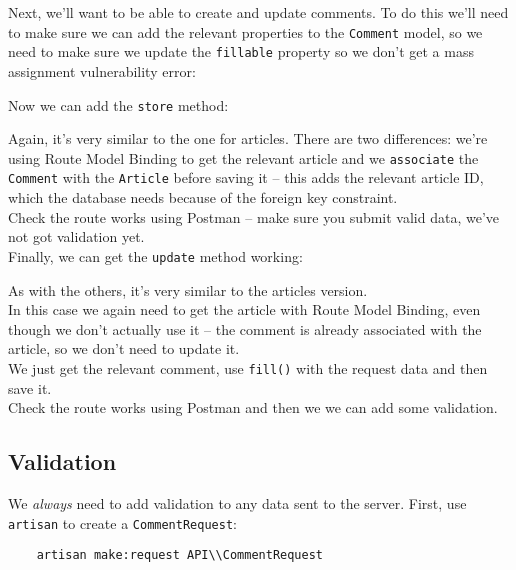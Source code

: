 Next, we'll want to be able to create and update comments. To do this we'll need to make sure we can add the relevant properties to the \texttt{Comment} model, so we need to make sure we update the \texttt{fillable} property so we don't get a mass assignment vulnerability error:


Now we can add the \texttt{store} method:


Again, it's very similar to the one for articles. There are two differences: we're using Route Model Binding to get the relevant article and we \texttt{associate} the \texttt{Comment} with the \texttt{Article} before saving it – this adds the relevant article ID, which the database needs because of the foreign key constraint.
\\

Check the route works using Postman – make sure you submit valid data, we've not got validation yet.
\\

Finally, we can get the \texttt{update} method working:


As with the others, it's very similar to the articles version.
\\

In this case we again need to get the article with Route Model Binding, even though we don't actually use it – the comment is already associated with the article, so we don't need to update it.
\\

We just get the relevant comment, use \texttt{fill()} with the request data and then save it.
\\

Check the route works using Postman and then we we can add some validation.


\subsection{Validation}

We \textit{always} need to add validation to any data sent to the server. First, use \texttt{artisan} to create a \texttt{CommentRequest}:

\begin{verbatim}
    artisan make:request API\\CommentRequest
\end{verbatim}

